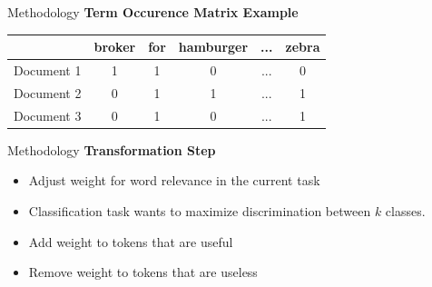 \begin{frame}[label=metho]{Methodology}
	\textbf{Term Occurence Matrix Example}
	
	
	\begin{table}[H]
		\centering
		\begin{tabular}{|c|c|c|c|c|c|}
			\hline 
			&  broker  & for & hamburger & ... & zebra   \\ 
			\hline 
			Document 1 &    1 & 1 & 0 & ... & 0  \\ 
			\hline 
			Document 2&    0 & 1 & 1 & ... & 1 \\ 
			\hline 
			Document 3 &    0 & 1 & 0 & ... & 1  \\ 
			\hline 
			
		\end{tabular} 
		
	\end{table}
	
\end{frame}


\begin{frame}[label=metho]{Methodology}
	\textbf{Transformation Step}
	\begin{itemize}
		\item Adjust weight for word relevance in the current task
		\item Classification task wants to maximize discrimination between $k$ classes.
		\item Add weight to tokens that are useful
		\item Remove weight to tokens that are useless
		
	\end{itemize}
\end{frame}




